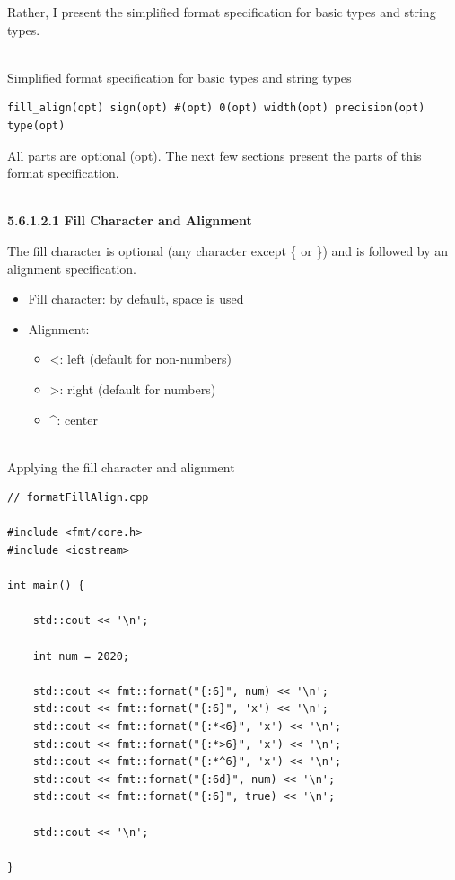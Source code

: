 Rather, I present the simplified format specification for basic types and string types.

\hspace*{\fill} \\ %
\noindent
Simplified format specification for basic types and string types
\begin{lstlisting}[style=styleCXX]
fill_align(opt) sign(opt) #(opt) 0(opt) width(opt) precision(opt) type(opt)
\end{lstlisting}

All parts are optional (opt). The next few sections present the parts of this format specification.

\hspace*{\fill} \\ %
\noindent
\textbf{5.6.1.2.1\hspace{0.2cm} Fill Character and Alignment}

The fill character is optional (any character except \{ or \}) and is followed by an alignment specification.

\begin{itemize}
\item 
Fill character: by default, space is used

\item 
Alignment:
\begin{itemize}
\item 
<: left (default for non-numbers)

\item 
>: right (default for numbers)

\item 
\^{}: center
\end{itemize}
\end{itemize}

\hspace*{\fill} \\ %
\noindent
Applying the fill character and alignment
\begin{lstlisting}[style=styleCXX]
// formatFillAlign.cpp

#include <fmt/core.h>
#include <iostream>

int main() {
	
	std::cout << '\n';
	
	int num = 2020;
	
	std::cout << fmt::format("{:6}", num) << '\n';
	std::cout << fmt::format("{:6}", 'x') << '\n';
	std::cout << fmt::format("{:*<6}", 'x') << '\n';
	std::cout << fmt::format("{:*>6}", 'x') << '\n';
	std::cout << fmt::format("{:*^6}", 'x') << '\n';
	std::cout << fmt::format("{:6d}", num) << '\n';
	std::cout << fmt::format("{:6}", true) << '\n';
	
	std::cout << '\n';
	
}
\end{lstlisting}

